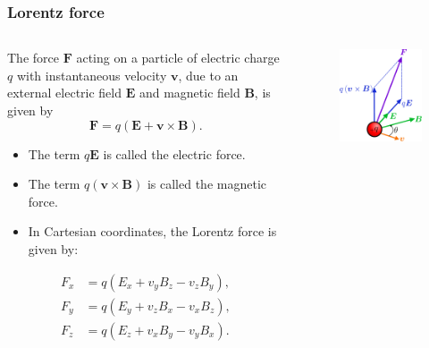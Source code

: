 \begin{frame}
	\frametitle{Lorentz force}
    \begin{columns}
		\begin{column}{0.6\textwidth}
        The force $\bm{F}$ acting on a particle of electric charge $q$ with instantaneous velocity $\bm{v}$, due to an external electric field $\bm{E}$ and magnetic field $\bm{B}$, is given by
            \begin{equation}
                \bm{F} = q\left(\bm{E} + \bm{v}\times\bm{B}\right).
            \end{equation}
            \pause
            \begin{itemize}
                \item The term $q\bm{E}$  is called the electric force. \pause
                \item The term $q\left(\bm{v}\times\bm{B}\right)$ is called the magnetic force. \pause
                \item In Cartesian coordinates, the Lorentz force is given by:
            \end{itemize}
            \begin{equation}
                \begin{aligned}
                    F_x &= q\left(E_x + v_yB_z - v_zB_y\right),\\
                    F_y &= q\left(E_y + v_zB_x - v_xB_z\right),\\
                    F_z &= q\left(E_z + v_xB_y - v_yB_x\right).
                \end{aligned}
            \end{equation}
		\end{column}
        \hfill
		\begin{column}{0.40\textwidth}
			\begin{figure}
				\centering
				\includegraphics[height=0.5\textheight]{fig/lec02/Lorentz_force_particle.pdf}

\end{figure}
\end{column}
\end{columns}
\end{frame}
